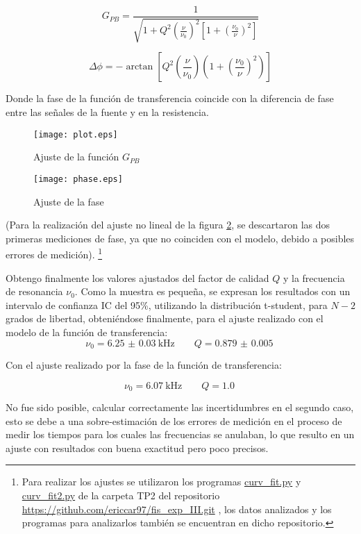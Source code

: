\documentclass[12pt,a4paper]{article}
\begin{document}
$$G_{PB} = \frac{1}{\sqrt{1 + Q^2 \left(\frac{\nu}{\nu_0} \right) ^2 \left[ 1 + \left(\frac{\nu_0}{\nu}\right)^2\right]}}$$

$$ \Delta \phi = -\arctan \left[ Q^2\left( \frac{\nu}{\nu_0} \right) \left( 1 + \left( \frac{\nu_0}{\nu} \right)^2 \right) \right] $$

Donde la fase de la función de transferencia coincide con la diferencia de fase entre las señales de la fuente y en la resistencia. 

\begin{figure}[H]
  \centering
   \texttt{[image: plot.eps]}
\caption{Ajuste de la función $G_{PB}$}
  \label{ajuste1}
\end{figure}

\begin{figure}[H]
  \centering
   \texttt{[image: phase.eps]}
\caption{Ajuste de la fase}
  \label{ajuste2}
\end{figure}

(Para la realización del ajuste no lineal de la figura \ref{ajuste2}, se descartaron las dos primeras mediciones de fase, ya que no coinciden con el modelo, debido a posibles errores de medición). \footnote{Para realizar los ajustes se utilizaron los programas \url{curv_fit.py} y \url{curv_fit2.py} de la carpeta TP2 del repositorio \url{https://github.com/ericcar97/fis_exp_III.git} , los datos analizados y los programas para analizarlos también se encuentran en dicho repositorio.}


\hspace{1cm}

Obtengo finalmente los valores ajustados del factor de calidad $Q$ y la frecuencia de resonancia $\nu_0$. Como la muestra es pequeña, se expresan los resultados con un intervalo de confianza IC del 95\%, utilizando la distribución t-student, para $N-2$ grados de libertad, obteniéndose finalmente, para el ajuste realizado con el modelo de la función de transferencia: 
$$\nu_0 = \SI{6.25(3)}{\kilo\hertz} \qquad Q = \SI{0.879(5)}{}$$

Con el ajuste realizado por la fase de la función de transferencia:

$$\nu_0 = \SI{6.07}{\kilo\hertz} \qquad Q = \SI{1.0}{}$$


No fue sido posible, calcular correctamente las incertidumbres en el segundo caso, esto se debe a una sobre-estimación de los errores de medición en el proceso de medir los tiempos para los cuales las frecuencias se anulaban, lo que resulto en un ajuste con resultados con buena exactitud pero poco precisos.  
\end{document}
